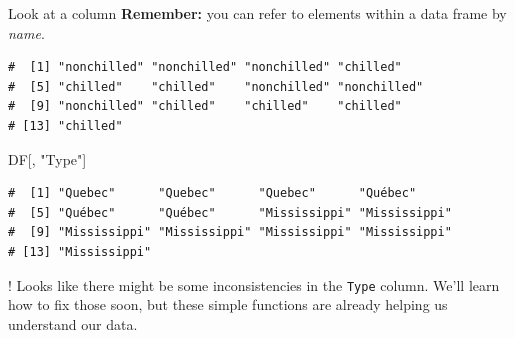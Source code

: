 \documentclass[
  11pt,
  ignorenonframetext,
]{beamer}
\newenvironment{Shaded}{\begin{snugshade}}{\end{snugshade}}
\newcommand{\NormalTok}[1]{#1}
\newcommand{\SpecialCharTok}[1]{\textcolor[rgb]{0.81,0.36,0.00}{\textbf{#1}}}
\newcommand{\StringTok}[1]{\textcolor[rgb]{0.31,0.60,0.02}{#1}}
\begin{document}
\begin{frame}{Look at a column}
\protect\hypertarget{look-at-a-column}{}
\textbf{Remember:} you can refer to elements within a data frame by
\emph{name}.

\begin{Shaded}
\end{Shaded}

\begin{verbatim}
#  [1] "nonchilled" "nonchilled" "nonchilled" "chilled"   
#  [5] "chilled"    "chilled"    "nonchilled" "nonchilled"
#  [9] "nonchilled" "chilled"    "chilled"    "chilled"   
# [13] "chilled"
\end{verbatim}

\begin{Shaded}
\begin{Highlighting}[]
\NormalTok{DF[, }\StringTok{"Type"}\NormalTok{]}
\end{Highlighting}
\end{Shaded}

\begin{verbatim}
#  [1] "Quebec"      "Quebec"      "Quebec"      "Québec"     
#  [5] "Québec"      "Québec"      "Mississippi" "Mississippi"
#  [9] "Mississippi" "Mississippi" "Mississippi" "Mississippi"
# [13] "Mississippi"
\end{verbatim}

\begin{block}{!}
\protect\hypertarget{section}{}
Looks like there might be some inconsistencies in the \texttt{Type}
column. We'll learn how to fix those soon, but these simple functions
are already helping us understand our data.
\end{block}
\end{frame}
\end{document}
